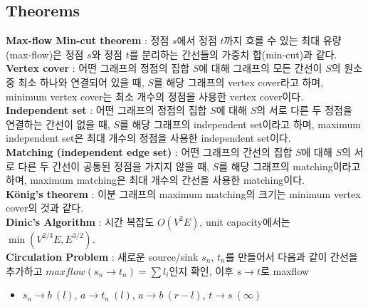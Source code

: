 \documentclass[landscape, 8pt, a4paper, oneside, twocolumn]{extarticle}
\begin{document}
\subsection{Theorems}
\noindent\textbf{Max-flow Min-cut theorem} : 정점 $ s $에서 정점 $ t $까지 흐를 수 있는 최대 유량(max-flow)은 정점 $ s $와 정점 $ t $를 분리하는 간선들의 가중치 합(min-cut)과 같다.\\
\textbf{Vertex cover} : 어떤 그래프의 정점의 집합 $ S $에 대해 그래프의 모든 간선이 $ S $의 원소 중 최소 하나와 연결되어 있을 때, $ S $를 해당 그래프의 vertex cover라고 하며, minimum vertex cover는 최소 개수의 정점을 사용한 vertex cover이다.\\
\textbf{Independent set} : 어떤 그래프의 정점의 집합 $ S $에 대해 $ S $의 서로 다른 두 정점을 연결하는 간선이 없을 때, $ S $를 해당 그래프의 independent set이라고 하며, maximum independent set은 최대 개수의 정점을 사용한 independent set이다.\\
\textbf{Matching (independent edge set)} : 어떤 그래프의 간선의 집합 $ S $에 대해 $ S $의 서로 다른 두 간선이 공통된 정점을 가지지 않을 때, $ S $를 해당 그래프의 matching이라고 하며, maximum matching은 최대 개수의 간선을 사용한 matching이다.\\
\textbf{K\"onig's theorem} : 이분 그래프의 maximum matching의 크기는 minimum vertex cover의 것과 같다.\\
\textbf{Dinic's Algorithm} : 시간 복잡도 $O(V^2E)$, unit capacity에서는 $\min(V^{2/3}E, E^{3/2})$.\\
\textbf{Circulation Problem} : 새로운 source/sink $s_{n}$, $t_{n}$를 만들어서 다음과 같이 간선을 추가하고 $maxflow(s_{n} \to t_{n}) = \sum l_i$인지 확인, 이후 $s \to t$로 maxflow
\begin{itemize}
\item $s_{n} \to b\ (l)$, $a \to t_{n}\ (l)$, $a \to b\ (r-l)$, $t \to s\ (\infty)$
\end{itemize}
\end{document}
